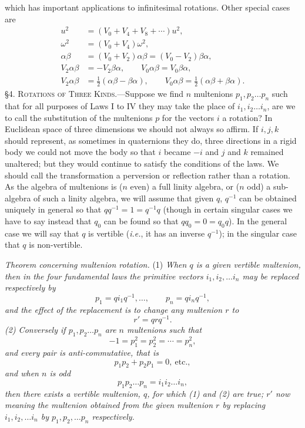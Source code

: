 \documentclass[11pt]{article}
\begin{document}
which has important applications to infinitesimal rotations. Other special cases are
\begin{align}u^2&=(V_0+V_4+V_8+\cdots)u^2,\tag{5}\\\omega^2&=(V_0+V_4)\omega^2,\tag{6}\\\alpha\beta&=(V_0+V_2)\alpha\beta=(V_0-V_2)\beta\alpha,\tag{7}\\V_2\alpha\beta&=-V_2\beta\alpha,\qquad V_0\alpha\beta=V_0\beta\alpha,\tag{8}\\V_2\alpha\beta&=\tfrac12(\alpha\beta-\beta\alpha),\qquad V_0\alpha\beta=\tfrac12(\alpha\beta+\beta\alpha).\tag{9}\end{align}
\noindent\textsc{\S 4. Rotations of Three Kinds.}---Suppose we find $n$ multenions $p_1,p_2\ldots p_n$ such that for all purposes of Laws I to IV they may take the place of $i_1,i_2\ldots i_n$, are we to call the substitution of the multenions $p$ for the vectors $i$ a rotation? In Euclidean space of three dimensions we should not always so affirm. If $i,j,k$ should represent, as sometimes in quaternions they do, three directions in a rigid body we could not move the body so that $i$ became $-i$ and $j$ and $k$ remained unaltered; but they would continue to satisfy the conditions of the laws. We should call the transformation a perversion or reflection rather than a rotation. As the algebra of multenions is ($n$ even) a full linity algebra, or ($n$ odd) a sub-algebra of such a linity algebra, we will assume that given $q$, $q^{-1}$ can be obtained uniquely in general so that $qq^{-1}=1=q^{-1}q$ (though in certain singular cases we have to say instead that $q_0$ can be found so that $qq_0=0=q_0q$). In the general case we will say that $q$ is vertible (\emph{i.e.}, it has an inverse $q^{-1}$); in the singular case that $q$ is non-vertible.

\indent \emph{Theorem concerning multenion rotation.} (1) \emph{When $q$ is a given vertible multenion, then in the four fundamental laws the primitive vectors $i_1,i_2,\ldots i_n$ may be replaced respectively by}
\begin{equation}p_1=qi_1q^{-1},\ldots,\qquad p_n=qi_nq^{-1},\tag{1}\end{equation}
\emph{and the effect of the replacement is to change any multenion $r$ to}
\begin{equation}r'=qrq^{-1}.\tag{2}\end{equation}
\emph{(2) Conversely if $p_1,p_2\ldots p_n$ are $n$ multenions such that}
\begin{equation}-1=p_1^2=p_2^2=\cdots=p_n^2,\tag{3}\end{equation}
\emph{and every pair is anti-commutative, that is}
\begin{equation}p_1p_2+p_2p_1=0,\ \text{etc.},\tag{4}\end{equation}
\emph{and when $n$ is odd}
\begin{equation}p_1p_2\ldots p_n=i_1i_2\ldots i_n,\tag{5}\end{equation}
\emph{then there exists a vertible multenion, $q$, for which (1) and (2) are true; $r'$ now meaning the multenion obtained from the given multenion $r$ by replacing $i_1,i_2,\ldots i_n$ by $p_1,p_2,\ldots p_n$ respectively.}
\end{document}
